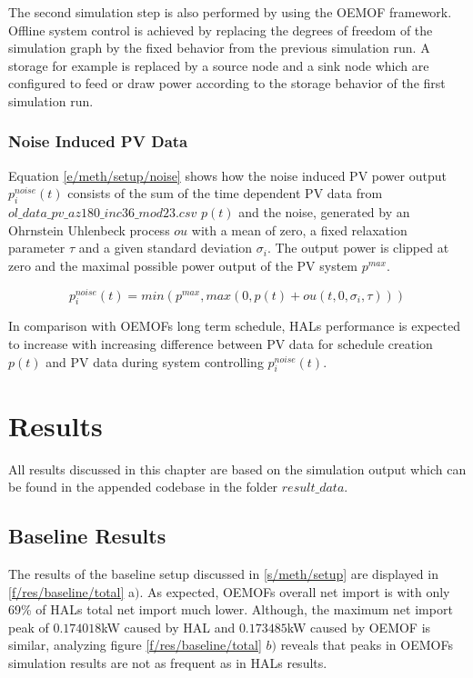 \documentclass[a4paper,12pt]{book}
\theoremstyle{break}
\begin{document}
The second simulation step is also performed by using the \ac{OEMOF} framework.
Offline system control is achieved by replacing the degrees of freedom of the simulation graph by the fixed behavior from the previous simulation run.
A storage for example is replaced by a source node and a sink node which are configured to feed or draw power according to the storage behavior of the first simulation run.

\subsection{Noise Induced PV Data}
Equation \ref{e/meth/setup/noise} shows how the noise induced \ac{PV} power output $p^{noise}_i(t)$ consists of the sum of the time dependent \ac{PV} data from $ol\_data\_pv\_az180\_inc36\_mod23.csv$ $p(t)$ and the noise, generated by an Ohrnstein Uhlenbeck process $ou$ with a mean of zero, a fixed relaxation parameter $\tau$ and a given standard deviation $\sigma_i$. The output power is clipped at zero and the maximal possible power output of the \ac{PV} system $p^{max}$.

\begin{equation}\label{e/meth/setup/noise}
	p^{noise}_i(t) = min(p^{max}, max(0, p(t) + ou(t, 0, \sigma_i, \tau)))
\end{equation}

In comparison with \ac{OEMOF}s long term schedule, HALs performance is expected to increase with increasing difference between \ac{PV} data for schedule creation $p(t)$ and \ac{PV} data during system controlling $p^{noise}_i(t)$.

\chapter{Results}\label{ch/results}
All results discussed in this chapter are based on the simulation output which can be found in the appended codebase in the folder $result\_data$.
\newpage
\section{Baseline Results}
The results of the baseline setup discussed in \ref{s/meth/setup} are displayed in \ref{f/res/baseline/total} a$)$. As expected, \ac{OEMOF}s overall net import is with only 69\% of HALs total net import much lower. Although, the maximum net import peak of $0.174018$kW caused by HAL and $0.173485$kW caused by \ac{OEMOF} is similar, analyzing figure \ref{f/res/baseline/total} $b)$ reveals that peaks in  \ac{OEMOF}s simulation results are not as frequent as in HALs results.
\end{document}
